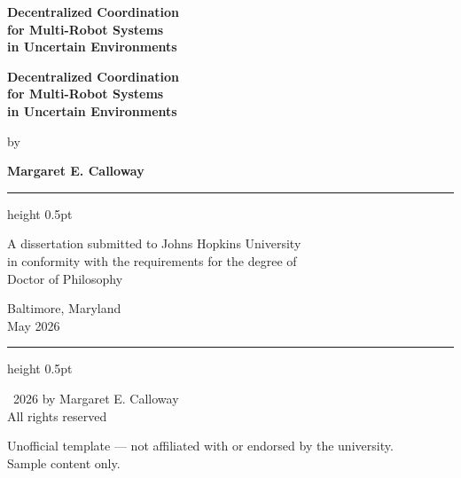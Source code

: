 \documentclass[12pt,oneside]{report}
\theoremstyle{definition}
\theoremstyle{remark}
\begin{document}
\thispagestyle{empty}
\vspace*{0.4\textheight}
\begin{center}
  {\Huge\bfseries\color{jhublue} Decentralized Coordination}\\[14pt]
  {\Huge\bfseries\color{jhublue} for Multi-Robot Systems}\\[14pt]
  {\Huge\bfseries\color{jhublue} in Uncertain Environments}
\end{center}
\clearpage

\thispagestyle{empty}
\begin{center}

\vspace*{18pt}

{\Huge\bfseries\color{jhublue} Decentralized Coordination}\\[10pt]
{\Huge\bfseries\color{jhublue} for Multi-Robot Systems}\\[10pt]
{\Huge\bfseries\color{jhublue} in Uncertain Environments}

\vspace{32pt}

{\large\color{jhuslate} by}

\vspace{16pt}

{\Large\bfseries\color{jhuslate} Margaret E. Calloway}

\vspace{60pt}

{
\color{jhublue}\hrule height 0.5pt
\vspace{16pt}
}

{\normalsize\color{jhuslate}
A dissertation submitted to Johns Hopkins University\\
in conformity with the requirements for the degree of\\
Doctor of Philosophy}

\vspace{16pt}

{\normalsize\color{jhuslate}
Baltimore, Maryland\\
May 2026}

\vspace{40pt}

{
\color{jhublue}\hrule height 0.5pt
}

\vspace{24pt}

{\footnotesize\color{jhublue}
\textcopyright\ 2026 by Margaret E. Calloway\\
All rights reserved}

\vfill

{\scriptsize\color{gray}
Unofficial template --- not affiliated with or endorsed by the university.\\
Sample content only.}

\end{center}
\clearpage
\end{document}
